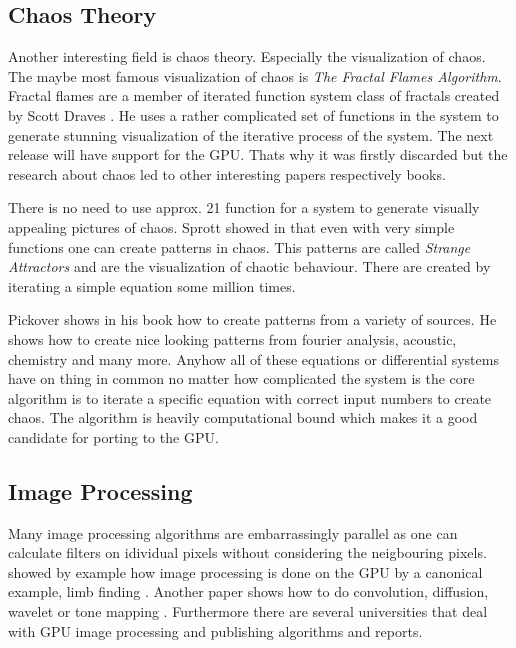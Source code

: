 \subsection{Chaos Theory} %
\label{par:chaos_theory}
Another interesting field is chaos theory. Especially the visualization of
chaos. The maybe most famous visualization of chaos is \emph{The Fractal Flames
Algorithm}. Fractal flames are a member of iterated function system class of
fractals created by Scott Draves \citep{citeulike:3801950}. He uses a rather
complicated set of functions in the system to generate stunning visualization of
the iterative process of the system. The next release will have support for the
GPU. Thats why it was firstly discarded but the research about chaos led to
other interesting papers respectively books.

There is no need to use approx. 21 function for a system to generate visually
appealing pictures of chaos. Sprott showed in \citep{citeulike:3745535} that even
with very simple functions one can create patterns in chaos. This patterns are
called \emph{Strange Attractors} and are the visualization of chaotic behaviour.
There are created by iterating a simple equation some million times. 

Pickover shows in his book \citep{citeulike:3812233} how to create patterns from
a variety of sources. He shows how to create nice looking patterns from fourier
analysis, acoustic, chemistry and many more. Anyhow all of these equations or
differential systems have on thing in common no matter how complicated the
system is the core algorithm is to iterate a specific equation with correct
input numbers to create chaos. The algorithm is heavily computational bound
which makes it a good candidate for porting to the \gls{GPU}.


\subsection{Image Processing}
Many image processing algorithms are embarrassingly parallel as one can calculate
filters on idividual pixels without considering the neigbouring pixels. 
 showed by example how image processing is done
on the \gls{GPU} by a canonical example, limb finding \citep{citeulike:6661950}. 
Another paper shows how to do convolution, diffusion, wavelet or tone mapping
\citep{citeulike:6661954}. Furthermore there are several universities that
deal with \gls{GPU} image processing and publishing algorithms and reports. 


